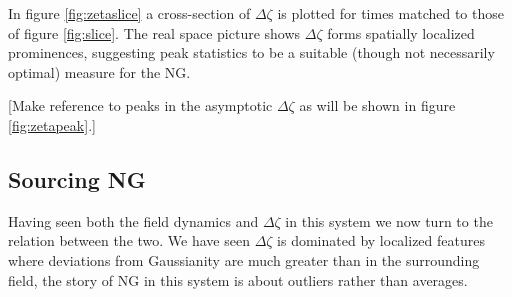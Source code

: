 In figure \ref{fig:zetaslice} a cross-section of $\Delta\zeta$ is plotted for times matched to those of figure \ref{fig:slice}.
The real space picture shows $\Delta\zeta$ forms spatially localized prominences, suggesting peak statistics to be a suitable (though not necessarily optimal) measure for the NG.

[Make reference to peaks in the asymptotic $\Delta\zeta$ as will be shown in figure \ref{fig:zetapeak}.]

\Fzetaslice
\Fzetapeak


\subsection{Sourcing NG} \label{sec:zeta production}




Having seen both the field dynamics and $\Delta\zeta$ in this system we now turn to the relation between the two.
We have seen $\Delta\zeta$ is dominated by localized features where deviations from Gaussianity are much greater than in the surrounding field, the story of NG in this system is about outliers rather than averages.



